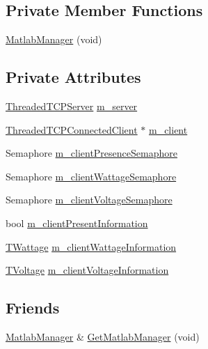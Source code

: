 \subsection*{Private Member Functions}
\begin{DoxyCompactItemize}
\item 
\hyperlink{class_matlab_manager_a319d996a8872d9cdba8cf335520af258}{Matlab\-Manager} (void)
\end{DoxyCompactItemize}
\subsection*{Private Attributes}
\begin{DoxyCompactItemize}
\item 
\hyperlink{class_threaded_t_c_p_server}{Threaded\-T\-C\-P\-Server} \hyperlink{class_matlab_manager_a2eea12132471953cf6cdb6effb7233f9}{m\-\_\-server}
\item 
\hyperlink{class_threaded_t_c_p_connected_client}{Threaded\-T\-C\-P\-Connected\-Client} $\ast$ \hyperlink{class_matlab_manager_a216ee97a37b033d6a02893206e1793e0}{m\-\_\-client}
\item 
Semaphore \hyperlink{class_matlab_manager_a97e67367dd6bf4b6976bcd2237277d46}{m\-\_\-client\-Presence\-Semaphore}
\item 
Semaphore \hyperlink{class_matlab_manager_a476eb9e68029520e9032f58672b7829e}{m\-\_\-client\-Wattage\-Semaphore}
\item 
Semaphore \hyperlink{class_matlab_manager_a18a1ab2e178279313daf7a0790b91f04}{m\-\_\-client\-Voltage\-Semaphore}
\item 
bool \hyperlink{class_matlab_manager_acf28415517fd10ff8105e5ac80280a63}{m\-\_\-client\-Present\-Information}
\item 
\hyperlink{class_matlab_manager_a410b78f356aeacba5c43efee93d8c27d}{T\-Wattage} \hyperlink{class_matlab_manager_af4c255ddf41fda74a77367a17520d21f}{m\-\_\-client\-Wattage\-Information}
\item 
\hyperlink{class_matlab_manager_a00f47f07c7dfd449fc39db6c09f6304a}{T\-Voltage} \hyperlink{class_matlab_manager_abf48a413742f5d98d4a13c68b60d9e83}{m\-\_\-client\-Voltage\-Information}
\end{DoxyCompactItemize}
\subsection*{Friends}
\begin{DoxyCompactItemize}
\item 
\hyperlink{class_matlab_manager}{Matlab\-Manager} \& \hyperlink{class_matlab_manager_adf11a697c41ba15207a66f8d2b567b75}{Get\-Matlab\-Manager} (void)
\end{DoxyCompactItemize}


